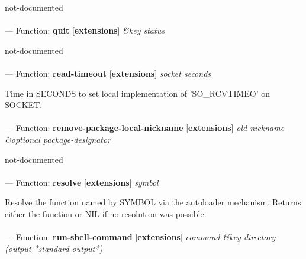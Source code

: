 \begin{adjustwidth}{5em}{5em}
not-documented
\end{adjustwidth}

\paragraph{}
\label{EXTENSIONS:QUIT}
--- Function: \textbf{quit} [\textbf{extensions}] \textit{\&key status}

\begin{adjustwidth}{5em}{5em}
not-documented
\end{adjustwidth}

\paragraph{}
\label{EXTENSIONS:READ-TIMEOUT}
--- Function: \textbf{read-timeout} [\textbf{extensions}] \textit{socket seconds}

\begin{adjustwidth}{5em}{5em}
Time in SECONDS to set local implementation of 'SO\_RCVTIMEO' on SOCKET.
\end{adjustwidth}

\paragraph{}
\label{EXTENSIONS:REMOVE-PACKAGE-LOCAL-NICKNAME}
--- Function: \textbf{remove-package-local-nickname} [\textbf{extensions}] \textit{old-nickname \&optional package-designator}

\begin{adjustwidth}{5em}{5em}
not-documented
\end{adjustwidth}

\paragraph{}
\label{EXTENSIONS:RESOLVE}
--- Function: \textbf{resolve} [\textbf{extensions}] \textit{symbol}

\begin{adjustwidth}{5em}{5em}
Resolve the function named by SYMBOL via the autoloader mechanism.
Returns either the function or NIL if no resolution was possible.
\end{adjustwidth}

\paragraph{}
\label{EXTENSIONS:RUN-SHELL-COMMAND}
--- Function: \textbf{run-shell-command} [\textbf{extensions}] \textit{command \&key directory (output *standard-output*)}


